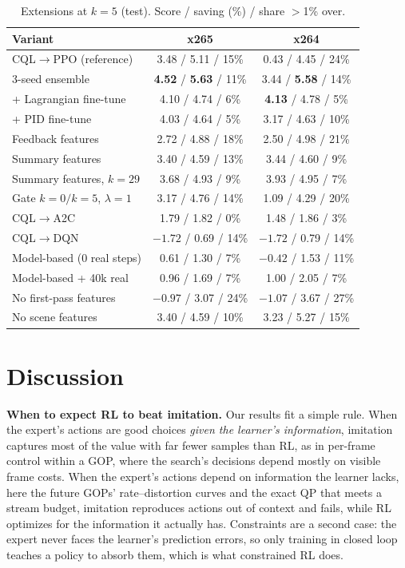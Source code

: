 \documentclass[conference]{IEEEtran}
\newcommand{\cqlppo}{CQL$\to$PPO}
\begin{document}
\begin{table}[t]
\centering\footnotesize
\caption{Extensions at $k{=}5$ (test). Score / saving (\%) / share $>$1\% over.}
\label{tab:ext}
\setlength{\tabcolsep}{2.5pt}
\begin{tabular}{@{}lcc@{}}
\toprule
Variant & x265 & x264\\
\midrule
\cqlppo{} (reference) & 3.48 / 5.11 / 15\% & 0.43 / 4.45 / 24\%\\
3-seed ensemble & \textbf{4.52} / \textbf{5.63} / 11\% & 3.44 / \textbf{5.58} / 14\%\\
+ Lagrangian fine-tune & 4.10 / 4.74 / 6\% & \textbf{4.13} / 4.78 / 5\%\\
+ PID fine-tune & 4.03 / 4.64 / 5\% & 3.17 / 4.63 / 10\%\\
Feedback features & 2.72 / 4.88 / 18\% & 2.50 / 4.98 / 21\%\\
Summary features & 3.40 / 4.59 / 13\% & 3.44 / 4.60 / 9\%\\
Summary features, $k{=}29$ & 3.68 / 4.93 / 9\% & 3.93 / 4.95 / 7\%\\
Gate $k{=}0/k{=}5$, $\lambda{=}1$ & 3.17 / 4.76 / 14\% & 1.09 / 4.29 / 20\%\\
CQL$\to$A2C & 1.79 / 1.82 / 0\% & 1.48 / 1.86 / 3\%\\
CQL$\to$DQN & $-1.72$ / 0.69 / 14\% & $-1.72$ / 0.79 / 14\%\\
Model-based (0 real steps) & 0.61 / 1.30 / 7\% & $-0.42$ / 1.53 / 11\%\\
Model-based + 40k real & 0.96 / 1.69 / 7\% & 1.00 / 2.05 / 7\%\\
No first-pass features & $-0.97$ / 3.07 / 24\% & $-1.07$ / 3.67 / 27\%\\
No scene features & 3.40 / 4.59 / 10\% & 3.23 / 5.27 / 15\%\\
\bottomrule
\end{tabular}
\end{table}

\section{Discussion}\label{sec:discussion}
\textbf{When to expect RL to beat imitation.} Our results fit a simple rule. When the expert's actions are good choices \emph{given the learner's information}, imitation captures most of the value with far fewer samples than RL, as in per-frame control within a GOP, where the search's decisions depend mostly on visible frame costs. When the expert's actions depend on information the learner lacks, here the future GOPs' rate--distortion curves and the exact QP that meets a stream budget, imitation reproduces actions out of context and fails, while RL optimizes for the information it actually has. Constraints are a second case: the expert never faces the learner's prediction errors, so only training in closed loop teaches a policy to absorb them, which is what constrained RL does.
\end{document}
